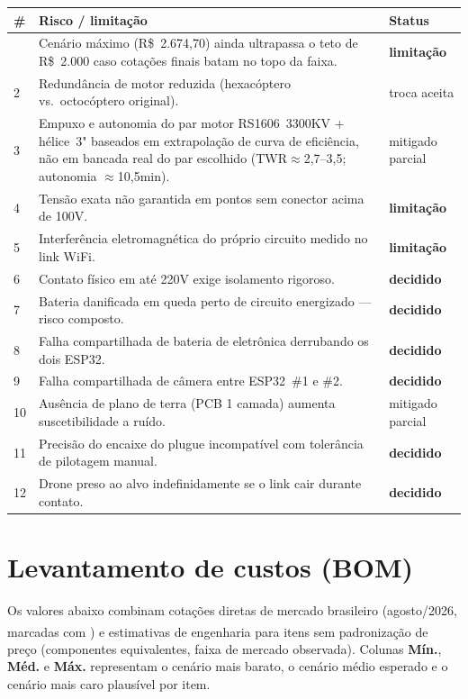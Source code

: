 \documentclass[11pt,a4paper]{article}
\newcommand{\statusok}{\textcolor{voltok}{\textbf{decidido}}}
\newcommand{\statushaz}{\textcolor{voltamber}{\textbf{limitação}}}
\newcommand{\pesq}{\textsuperscript{\textdagger}}
\begin{document}
\begin{longtable}{@{}p{0.7cm}p{9.6cm}p{3.4cm}@{}}
\toprule
\textbf{\#} & \textbf{Risco / limitação} & \textbf{Status} \\
\midrule
\endhead
\bottomrule
\endfoot
1 & Cenário máximo (R\$~2.674,70) ainda ultrapassa o teto de R\$~2.000 caso cotações finais batam no topo da faixa. & \statushaz \\
2 & Redundância de motor reduzida (hexacóptero vs.\ octocóptero original). & troca aceita \\
3 & Empuxo e autonomia do par motor RS1606~3300KV + hélice~3" baseados em extrapolação de curva de eficiência, não em bancada real do par escolhido (TWR$\approx$2,7--3,5; autonomia $\approx$10,5min). & mitigado parcial \\
4 & Tensão exata não garantida em pontos sem conector acima de 100V. & \statushaz \\
5 & Interferência eletromagnética do próprio circuito medido no link WiFi. & \statushaz \\
6 & Contato físico em até 220V exige isolamento rigoroso. & \statusok \\
7 & Bateria danificada em queda perto de circuito energizado — risco composto. & \statusok \\
8 & Falha compartilhada de bateria de eletrônica derrubando os dois ESP32. & \statusok \\
9 & Falha compartilhada de câmera entre ESP32~\#1 e \#2. & \statusok \\
10 & Ausência de plano de terra (PCB 1 camada) aumenta suscetibilidade a ruído. & mitigado parcial \\
11 & Precisão do encaixe do plugue incompatível com tolerância de pilotagem manual. & \statusok \\
12 & Drone preso ao alvo indefinidamente se o link cair durante contato. & \statusok \\
\end{longtable}

\section{Levantamento de custos (BOM)}

Os valores abaixo combinam cotações diretas de mercado brasileiro (agosto/2026, marcadas com \pesq) e estimativas de engenharia para itens sem padronização de preço (componentes equivalentes, faixa de mercado observada). Colunas \textbf{Mín.}, \textbf{Méd.} e \textbf{Máx.} representam o cenário mais barato, o cenário médio esperado e o cenário mais caro plausível por item.
\end{document}
